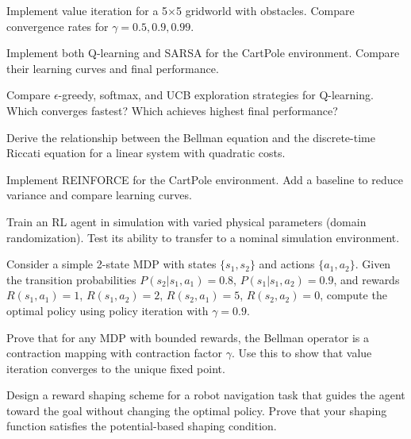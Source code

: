 \begin{exercise}
Implement value iteration for a 5$\times$5 gridworld with obstacles. Compare convergence rates for $\gamma = 0.5, 0.9, 0.99$.
\end{exercise}

\begin{exercise}
Implement both Q-learning and SARSA for the CartPole environment. Compare their learning curves and final performance.
\end{exercise}

\begin{exercise}
Compare $\epsilon$-greedy, softmax, and UCB exploration strategies for Q-learning. Which converges fastest? Which achieves highest final performance?
\end{exercise}

\begin{exercise}
Derive the relationship between the Bellman equation and the discrete-time Riccati equation for a linear system with quadratic costs.
\end{exercise}

\begin{exercise}
Implement REINFORCE for the CartPole environment. Add a baseline to reduce variance and compare learning curves.
\end{exercise}

\begin{exercise}
Train an RL agent in simulation with varied physical parameters (domain randomization). Test its ability to transfer to a nominal simulation environment.
\end{exercise}

\begin{exercise}
Consider a simple 2-state MDP with states $\{s_1, s_2\}$ and actions $\{a_1, a_2\}$. Given the transition probabilities $P(s_2|s_1, a_1) = 0.8$, $P(s_1|s_1, a_2) = 0.9$, and rewards $R(s_1, a_1) = 1$, $R(s_1, a_2) = 2$, $R(s_2, a_1) = 5$, $R(s_2, a_2) = 0$, compute the optimal policy using policy iteration with $\gamma = 0.9$.
\end{exercise}

\begin{exercise}
Prove that for any MDP with bounded rewards, the Bellman operator is a contraction mapping with contraction factor $\gamma$. Use this to show that value iteration converges to the unique fixed point.
\end{exercise}

\begin{exercise}
Design a reward shaping scheme for a robot navigation task that guides the agent toward the goal without changing the optimal policy. Prove that your shaping function satisfies the potential-based shaping condition.
\end{exercise}

